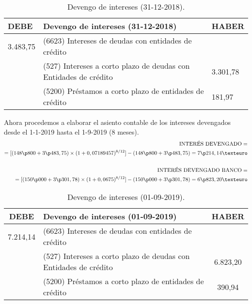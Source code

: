 \begin{table}[H]
    \centering
    \begin{tabular}{|p{3cm}|p{6cm}|p{2cm}|}
        \hline
        \rowcolor{blue!30}
        \textbf{DEBE} & \textbf{Devengo de intereses (31-12-2018)} & \textbf{HABER} \\
        \hline
        3.483,75 & (6623) Intereses de deudas con entidades de crédito  & \\
        \hline
        & (527) Intereses a corto plazo de deudas con Entidades de crédito   & 3.301,78 \\
        \hline
        & (5200) Préstamos a corto plazo de entidades de crédito & 181,97 \\
        \hline
    \end{tabular}
    \caption{Devengo de intereses (31-12-2018).}
    \label{tabla:devengo_intereses}
\end{table}

Ahora procedemos a elaborar el asiento contable de los intereses devengados desde el 1-1-2019 hasta el 1-9-2019 (8 meses).
\begin{align*}
    \text{INTERÉS DEVENGADO} = \\
    = [(148\p800 + 3\p483,75) \times (1 + 0,07189457)^{8/12}] - (148\p800 + 3\p483,75) = 7\p214,14 € \\
    \\
    \text{INTERÉS DEVENGADO BANCO} = \\
    = [(150\p000 + 3\p301,78) \times (1 + 0,0675)^{8/12}] - (150\p000 + 3\p301,78) = 6\p823,20 €
\end{align*}

\begin{table}[H]
    \centering
    \begin{tabular}{|c|p{6cm}|c|}
        \hline
        \rowcolor{blue!30}
        \textbf{DEBE} & \textbf{Devengo de intereses (01-09-2019)} & \textbf{HABER} \\
        \hline
        7.214,14 & (6623) Intereses de deudas con entidades de crédito & \\
        \hline
        & (527) Intereses a corto plazo de deudas con Entidades de crédito & 6.823,20 \\
        \hline
        & (5200) Préstamos a corto plazo de entidades de crédito & 390,94 \\
        \hline
    \end{tabular}
    \caption{Devengo de intereses (01-09-2019).}
    \label{tabla:devengo_intereses_2019}
\end{table}

